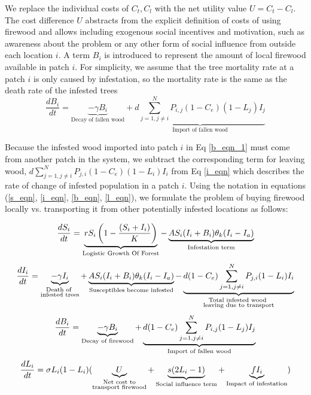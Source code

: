 We replace the individual costs of $C_t, C_l$ with the net utility value $U = C_t - C_l$. The cost difference $U$ abstracts from the explicit definition of costs of using firewood \cite{barlow2014modelling} and allows including exogenous social incentives and motivation, such as awareness about the problem or any other form of social influence from outside each location $i$.
A term $B_i$ is introduced to represent the amount of local firewood available in patch $i$. For simplicity, we assume that the tree mortality rate at a patch $i$ is only caused by infestation, so the mortality rate is the same as the death rate of the infested trees
\begin{equation}
\label{b_eqn_1}
\frac{d B_i}{dt} = \underbrace{-\gamma B_i}_{\text{Decay of fallen wood}} + \underbrace{d\sum_{j = 1, j\neq i}^N P_{i,j} (1 - C_e) (1 - L_j)I_j}_{\text{Import of fallen wood}}
\end{equation}

Because the infested wood imported into patch $i$ in Eq \ref{b_eqn_1} must come from another patch in the system, we subtract the corresponding term for leaving wood, $d\sum_{j = 1, j\neq i}^N P_{j,i} (1 - C_e) (1 - L_i)I_i$  from Eq \ref{i_eqn} which describes the rate of change of infested population in a patch $i$. Using the notation in equations (\ref{s_eqn}, \ref{i_eqn}, \ref{b_eqn}, \ref{l_eqn}), we formulate the problem of buying firewood locally vs. transporting it from other potentially infested locations as follows: 

\begin{equation}
\frac{d S_i}{dt} = \underbrace{ r S_i\left(1 - \frac{(S_i + I_i)}{K}\right)}_{\text{Logistic Growth Of Forest}} - \underbrace{A S_i (I_i+ B_i)\theta_k(I_i - I_a)}_{\text{Infestation term}}
\protect \label{s_eqn}
\end{equation}
\begin{equation}
\frac{d I_i}{dt} = \underbrace{-\gamma I_i}_{\substack{\text{Death of }\\\text{infested trees}}} + \underbrace{A S_i (I_i+ B_i)\theta_k(I_i - I_a)}_{\text{Susceptibles become infested}}- \underbrace{d(1 - C_e) \sum_{j = 1, j\neq i}^N P_{j,i} (1 - L_i)I_i}_{\substack{\text{Total infested wood }\\\text{leaving due to transport}}}
\protect \label{i_eqn}
\end{equation}
\begin{equation}
\frac{d B_i}{dt} = \underbrace{-\gamma B_i}_{\text{Decay of firewood}} + \underbrace{d(1 - C_e)\sum_{j = 1, j\neq i}^N P_{i,j}  (1 - L_j)I_j}_{\text{Import of fallen wood}}
\protect \label{b_eqn}
\end{equation}
\begin{equation}
\frac{d L_i}{dt} = \sigma L_i (1 -L_i)(\underbrace{U}_{\substack{\text{Net cost to}\\\text{transport firewood}}} + \underbrace{s (2 L_i - 1)}_{\text{Social influence term}} + \underbrace{f I_i}_{\text{Impact of infestation}})  
\protect \label{l_eqn}
\end{equation}

